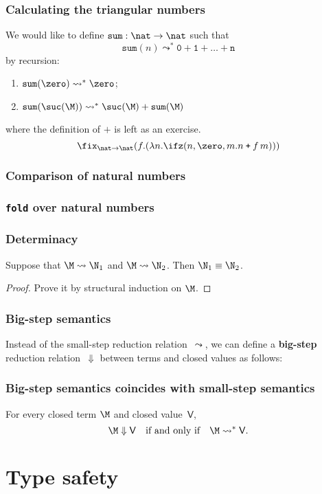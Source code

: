 \begin{frame}
  \frametitle{Calculating the triangular numbers}
  We would like to define $\mathtt{sum}:\nat \to\nat$ such that 
  \[
    \mathtt{sum}(n) \leadsto^* \mathtt{0 + 1 + \dots + n} 
  \]
  by recursion:
  \begin{enumerate}
    \item $\mathtt{sum}(\zero) \leadsto^* \zero$; 
    \item $\mathtt{sum}(\suc(\M)) \leadsto^* \suc(\M)\mathbin{\mathtt{+}}\mathtt{sum}(\M)$
  \end{enumerate}
  where the definition of $\texttt{+}$ is left as an exercise.
  \begin{equation}
    \label{eq:triangular_num}
    \fix_{\nat \to \nat}(f . (\lambda n . \ifz(n, \zero, m . n
    \mathbin{\texttt{+}} f\, m)))
  \end{equation}
\end{frame}
\begin{frame}
  \frametitle{Comparison of natural numbers}
\end{frame}
\begin{frame}
  \frametitle{\texttt{fold} over natural numbers}
\end{frame}
\begin{frame}
  \frametitle{Determinacy}
  \begin{theorem}
    Suppose that
    $\M \leadsto \N_1$ and $\M \leadsto \N_2$. Then $\N_1 \equiv \N_2$. 
  \end{theorem}
  \begin{proof}
    Prove it by structural induction on $\M$. 
  \end{proof}
\end{frame}
\begin{frame}
  \frametitle{Big-step semantics}
  Instead of the small-step reduction relation~$\leadsto$, we can define a
  \textbf{big-step} reduction relation~$\Downarrow$
  between terms and \alert{closed values} as follows: 
\end{frame}
\begin{frame}
  \frametitle{Big-step semantics coincides with small-step semantics}
  \begin{theorem}
    For every closed term $\M$ and closed value~$\mathsf{V}$, 
    \[
      \M \Downarrow \mathsf{V}
      \quad
      \text{if and only if}
      \quad
      \M \leadsto^* \mathsf{V}. 
    \]
  \end{theorem}
\end{frame}
\section{Type safety}
\begin{frame}
\end{frame}
